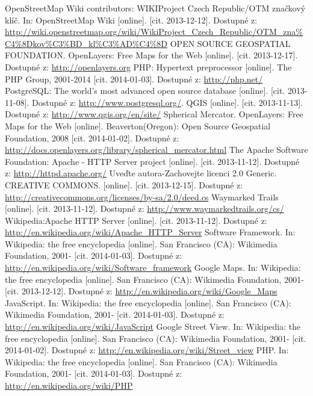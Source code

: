 \documentclass[11pt,a4paper,titlepage,oneside]{book}
\begin{document}
\begin{thebibliography}{99}
	 OpenStreetMap Wiki contributors: WIKIProject Czech Republic/OTM značkový klíč. In: OpenStreetMap Wiki [online]. [cit. 2013-12-12]. Dostupné z: 	\url{http://wiki.openstreetmap.org/wiki/WikiProject_Czech_Republic/OTM_zna%C4%8Dkov%C3%BD_kl%C3%AD%C4%8D}
	OPEN SOURCE GEOSPATIAL FOUNDATION. OpenLayers: Free Maps for the Web [online]. [cit. 2013-12-17]. Dostupné z: \url{http://openlayers.org} 
	PHP: Hypertext preprocessor [online]. The PHP Group, 2001-2014 [cit. 2014-01-03]. Dostupné z: \url{http://php.net/}
	 PostgreSQL: The world's most advanced open source database [online]. [cit. 2013-11-08]. Dostupné z: \url{http://www.postgresql.org/}.
	QGIS [online]. [cit. 2013-11-13]. Dostupné z: \url{http://www.qgis.org/en/site/}
	Spherical Mercator. OpenLayers: Free Maps for the Web [online]. Beaverton(Oregon): Open Source Geospatial Foundation, 2008 [cit. 2014-01-02]. Dostupné z: \url{http://docs.openlayers.org/library/spherical_mercator.html}
	The Apache Software Foundation: Apache - HTTP Server project [online]. [cit. 2013-11-12]. Dostupné z: \url{http://httpd.apache.org/}
	Uveďte autora-Zachovejte licenci 2.0 Generic. CREATIVE COMMONS. [online]. [cit. 2013-12-15]. Dostupné z: \url{http://creativecommons.org/licenses/by-sa/2.0/deed.cs}
	 Waymarked Trails [online].  [cit. 2013-11-12]. Dostupné z: \url{http://www.waymarkedtrails.org/cs/}
	Wikipedia:Apache HTTP Server [online]. [cit. 2013-11-12]. Dostupné z: \url{http://en.wikipedia.org/wiki/Apache_HTTP_Server}	
       Software Framework. In: Wikipedia: the free encyclopedia [online]. San Francisco (CA): Wikimedia Foundation, 2001- [cit. 2014-01-03]. Dostupné z: \url{http://en.wikipedia.org/wiki/Software_framework}	
	Google Maps. In: Wikipedia: the free encyclopedia [online]. San Francisco (CA): Wikimedia Foundation, 2001- [cit. 2013-12-12]. Dostupné z: \url{http://en.wikipedia.org/wiki/Google_Maps}
       	JavaScript. In: Wikipedia: the free encyclopedia [online]. San Francisco (CA): Wikimedia Foundation, 2001- [cit. 2014-01-03]. Dostupné z: \url{http://en.wikipedia.org/wiki/JavaScript}
        Google Street View. In: Wikipedia: the free encyclopedia [online]. San Francisco (CA): Wikimedia Foundation, 2001- [cit. 2014-01-02]. Dostupné z: \url{http://en.wikipedia.org/wiki/Street_view}
	PHP. In: Wikipedia: the free encyclopedia [online]. San Francisco (CA): Wikimedia Foundation, 2001- [cit. 2014-01-03]. Dostupné z: \url{http://en.wikipedia.org/wiki/PHP}

\end{thebibliography}
\end{document}
